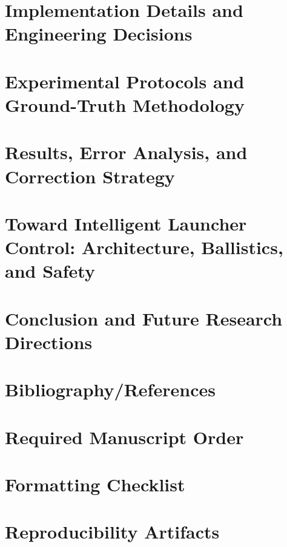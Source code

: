 \documentclass[12pt,a4paper]{report}
\begin{document}
\chapter{Implementation Details and Engineering Decisions}


\clearpage
\chapter{Experimental Protocols and Ground-Truth Methodology}


\clearpage
\chapter{Results, Error Analysis, and Correction Strategy}


\clearpage
\chapter{Toward Intelligent Launcher Control: Architecture, Ballistics, and Safety}


\clearpage
\chapter{Conclusion and Future Research Directions}


\clearpage
\chapter*{Bibliography/References}


\appendix
\clearpage
\chapter{Required Manuscript Order}


\clearpage
\chapter{Formatting Checklist}


\clearpage
\chapter{Reproducibility Artifacts}

\end{document}
